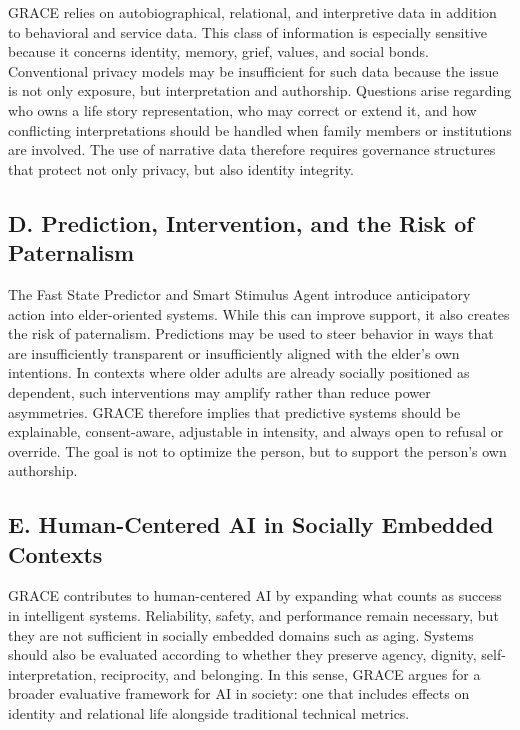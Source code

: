 \documentclass[
  journal,
]{IEEEtran}%
\begin{document}
GRACE relies on autobiographical, relational, and interpretive data in
addition to behavioral and service data. This class of information is
especially sensitive because it concerns identity, memory, grief,
values, and social bonds. Conventional privacy models may be
insufficient for such data because the issue is not only exposure, but
interpretation and authorship. Questions arise regarding who owns a life
story representation, who may correct or extend it, and how conflicting
interpretations should be handled when family members or institutions
are involved. The use of narrative data therefore requires governance
structures that protect not only privacy, but also identity integrity.

\subsection{D. Prediction, Intervention, and the Risk of
Paternalism}\label{d.-prediction-intervention-and-the-risk-of-paternalism}

The Fast State Predictor and Smart Stimulus Agent introduce anticipatory
action into elder-oriented systems. While this can improve support, it
also creates the risk of paternalism. Predictions may be used to steer
behavior in ways that are insufficiently transparent or insufficiently
aligned with the elder's own intentions. In contexts where older adults
are already socially positioned as dependent, such interventions may
amplify rather than reduce power asymmetries. GRACE therefore implies
that predictive systems should be explainable, consent-aware, adjustable
in intensity, and always open to refusal or override. The goal is not to
optimize the person, but to support the person's own authorship.

\subsection{E. Human-Centered AI in Socially Embedded
Contexts}\label{e.-human-centered-ai-in-socially-embedded-contexts}

GRACE contributes to human-centered AI by expanding what counts as
success in intelligent systems. Reliability, safety, and performance
remain necessary, but they are not sufficient in socially embedded
domains such as aging. Systems should also be evaluated according to
whether they preserve agency, dignity, self-interpretation, reciprocity,
and belonging. In this sense, GRACE argues for a broader evaluative
framework for AI in society: one that includes effects on identity and
relational life alongside traditional technical metrics.
\end{document}
